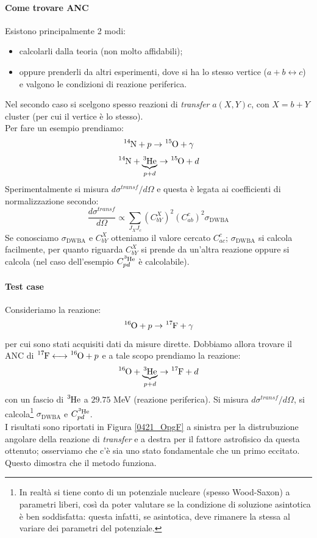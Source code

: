 \paragraph{Come trovare ANC} Esistono principalmente 2 modi:
\begin{itemize}
	\item calcolarli dalla teoria (non molto affidabili);
	\item oppure prenderli da altri esperimenti, dove si ha lo stesso vertice ($a+b \longleftrightarrow c$) e valgono le condizioni di reazione periferica.
\end{itemize}
\noindent Nel secondo caso si scelgono spesso reazioni di \textit{transfer} $a(X,Y)c$, con $X=b+Y$ cluster (per cui il vertice è lo stesso).\\ 
Per fare un esempio prendiamo:
$$\ce{^{14}N} + p \to \ce{^{15}O} + \gamma$$
$$\ce{^{14}N} + \underbrace{\ce{^{3}He}}_{p+d} \to \ce{^{15}O}+ d$$
Sperimentalmente si misura $d\sigma^{transf}/d\Omega$ e questa è legata ai coefficienti di normalizzazione secondo:
$$\frac{d\sigma^{transf}}{d\Omega}\propto \sum_{J_X J_c} (C_{bY}^X)^2 (C_{ab}^c)^2 \sigma_\text{DWBA}$$
Se conosciamo $\sigma_\text{DWBA}$ e $C_{bY}^X$ otteniamo il valore cercato $C_{ac}^c$; $\sigma_\text{DWBA}$ si calcola facilmente, per quanto riguarda $C_{bY}^X$ si prende da un'altra reazione oppure si calcola (nel caso dell'esempio $C_{pd}^{\ce{^3He}}$ è calcolabile).

\paragraph{Test case} Consideriamo la reazione:
$$\ce{^{16}O} + p \to \ce{^{17}F} + \gamma$$
per cui sono stati acquisiti dati da misure dirette. Dobbiamo allora trovare il ANC di $\ce{^{17}F} \longleftrightarrow \ce{^{16}O} + p$ e a tale scopo prendiamo la reazione:
$$\ce{^{16}O} + \underbrace{\ce{^3He}}_{p+d} \to \ce{^{17}F} + d$$
con un fascio di $\ce{^3He}$ a $29.75$ MeV (reazione periferica). Si misura $d\sigma^{transf}/d\Omega$, si calcola\footnote{In realtà si tiene conto di un potenziale nucleare (spesso Wood-Saxon) a parametri liberi, così da poter valutare se la condizione di soluzione asintotica è ben soddisfatta: questa infatti, se asintotica, deve rimanere la stessa al variare dei parametri del potenziale.} $\sigma_\text{DWBA}$ e $C_{pd}^{\ce{^3He}}$.\\ 
I risultati sono riportati in Figura \ref{0421_OpgF} a sinistra per la distrubuzione angolare della reazione di \textit{transfer} e a destra per il fattore astrofisico da questa ottenuto; osserviamo che c'è sia uno stato fondamentale che un primo eccitato. Questo dimostra che il metodo funziona.

